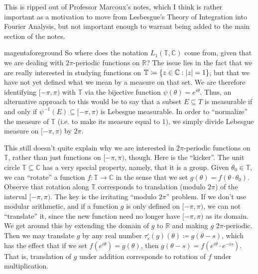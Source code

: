 \documentclass[notoc,notitlepage]{tufte-book}
\begin{document}
This is ripped out of Professor Marcoux's \cite{marcoux2019} notes,
which I think is rather important as a motivation to move from
Lesbesgue's Theory of Integration into Fourier Analysis,
but not important enough to warrant being added to the
main section of the notes.
\begin{quotebox}{magenta}{foreground}
So where does the notation $L_1 (\mathbb{T}, \mathbb{C})$ come from,
given that we are dealing with $2 \pi$-periodic functions on $\mathbb{R}$?
The issue lies in the fact that we are really interested in studying functions
on $\mathbb{T} \coloneqq \{z \in \mathbb{C} : \left|z\right| = 1\}$,
but that we have not yet defined what we mean by a measure on that set.
We are therefore identifying $[-\pi, \pi)$ with $\mathbb{T}$ via
the bijective function $\psi(\theta) = e^{i \theta}$.
Thus, an alternative approach to this would be to say that
a subset $E \subseteq T$ is measurable if and only if
$\psi^{-1}(E) \subseteq [-\pi, \pi)$ is Lebesgue measurable.
In order to ``normalize'' the measure of $\mathbb{T}$
(i.e. to make its measure equal to 1),
we simply divide Lebesgue measure on $[-\pi, \pi)$ by $2 \pi$.

This still doesn't quite explain why we are interested in $2 \pi$-periodic functions
on $\mathbb{T}$, rather than just functions on $[-\pi, \pi)$, though.
Here is the ``kicker''.
The unit circle $\mathbb{T} \subseteq \mathbb{C}$ has a very special property,
namely, that it is a group.
Given $\theta_0 \in \mathbb{T}$, we can ``rotate'' a function
$f : \mathbb{T} \to \mathbb{C}$ in the sense that we set
$g(\theta) = f (\theta \cdot \theta_0 )$.
Observe that rotation along $\mathbb{T}$ corresponds to translation
(modulo $2 \pi$) of the interval $[-\pi, \pi)$.
The key is the irritating ``modulo $2 \pi$'' problem.
If we don't use modular arithmetic, and if a function $g$ is only defined
on $[-\pi, \pi)$, we can not ``translate'' it,
since the new function need no longer have $[-\pi, \pi)$ as its domain.
We get around this by extending the domain of $g$ to $\mathbb{R}$
and making $g$ $2 \pi$-periodic.
Then we may translate $g$ by any real number
$\tau_s^\circ(g)(\theta) \coloneqq g(\theta - s)$,
which has the effect that if we set $f (e^{i \theta}) = g(\theta)$,
then $g(\theta - s) = f (e^{i \theta} \cdot e^{-is})$.
That is, translation of $g$ under addition corresponds to
rotation of $f$ under multiplication.


\end{quotebox}
\end{document}
